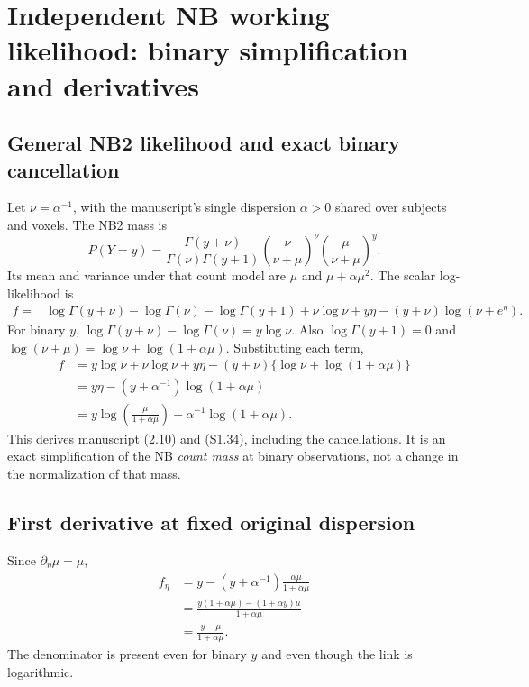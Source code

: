 \documentclass[11pt,a4paper]{article}
\numberwithin{equation}{section}
\begin{document}
\section{Independent NB working likelihood: binary simplification and derivatives}
\label{lesion-nb}

\subsection{General NB2 likelihood and exact binary cancellation}
Let $\nu=\alpha^{-1}$, with the manuscript's single dispersion
$\alpha>0$ shared over subjects and voxels. The NB2 mass is
\[
 P(Y=y)=\frac{\Gamma(y+\nu)}{\Gamma(\nu)\Gamma(y+1)}
      \left(\frac{\nu}{\nu+\mu}\right)^\nu
      \left(\frac\mu{\nu+\mu}\right)^y.
\]
Its mean and variance under that count model are $\mu$ and
$\mu+\alpha\mu^2$.
The scalar log-likelihood is
\begin{align}
 f={}&\log\Gamma(y+\nu)-\log\Gamma(\nu)-\log\Gamma(y+1)
       +\nu\log\nu+y\eta-(y+\nu)\log(\nu+e^\eta).
\end{align}
For binary $y$,
$\log\Gamma(y+\nu)-\log\Gamma(\nu)=y\log\nu$.
Also $\log\Gamma(y+1)=0$ and
$\log(\nu+\mu)=\log\nu+\log(1+\alpha\mu)$.
Substituting each term,
\begin{align}
 f&=y\log\nu+\nu\log\nu+y\eta
          -(y+\nu)\{\log\nu+\log(1+\alpha\mu)\}\\
  &=y\eta-(y+\alpha^{-1})\log(1+\alpha\mu)\\
  &=y\log\left(\frac\mu{1+\alpha\mu}\right)
                  -\alpha^{-1}\log(1+\alpha\mu).
 \label{lesion-binary-nb}
\end{align}
This derives manuscript (2.10) and (S1.34), including the cancellations.
It is an exact simplification of the NB \emph{count mass} at
binary observations, not a change in the normalization of that mass.

\subsection{First derivative at fixed original dispersion}
Since $\partial_\eta\mu=\mu$,
\begin{align}
 f_\eta
 &=y-(y+\alpha^{-1})\frac{\alpha\mu}{1+\alpha\mu}\\
 &=\frac{y(1+\alpha\mu)-(1+\alpha y)\mu}{1+\alpha\mu}\\
 &=\frac{y-\mu}{1+\alpha\mu}.
 \label{lesion-nb-score}
\end{align}
The denominator is present even for binary $y$ and even though
the link is logarithmic.
\end{document}
